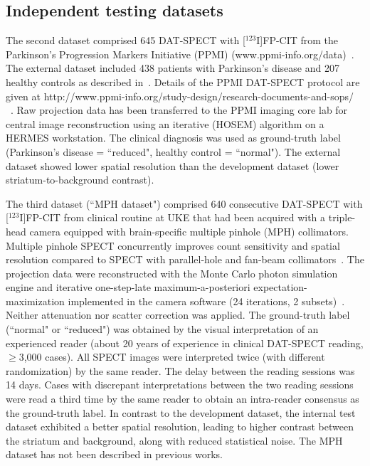 \subsection{Independent testing datasets}
\label{subsec:external_dataset}

The second dataset comprised 645 DAT-SPECT with [$^{123}$I]FP-CIT from the Parkinson's Progression Markers Initiative (PPMI) 
(www.ppmi-info.org/data)~\citep{Parkinson_Progression_Marker_Initiative2011-px}.
The external dataset included 438 patients with Parkinson's disease and 207 healthy controls as described in~\cite{Wenzel2019}.
Details of the PPMI DAT-SPECT protocol are given at http://www.ppmi-info.org/study-design/research-documents-and-sops/ ~\citep{Parkinson_Progression_Marker_Initiative2011-px}. 
Raw projection data has been transferred to the PPMI imaging core lab for central image reconstruction using an iterative (HOSEM) algorithm on a HERMES workstation. 
The clinical diagnosis was used as ground-truth label (Parkinson's disease = ``reduced", healthy control = ``normal"). 
The external dataset showed lower spatial resolution than the development dataset (lower striatum-to-background contrast).

The third dataset (``MPH dataset") comprised 640 consecutive DAT-SPECT with [$^{123}$I]FP-CIT from clinical routine at UKE 
that had been acquired with a triple-head camera equipped with brain-specific multiple pinhole (MPH) collimators. 
Multiple pinhole SPECT concurrently improves count sensitivity and spatial resolution compared to SPECT with parallel-hole 
and fan-beam collimators~\citep{Mathies2022-yi, Tecklenburg2020-xr}.
The projection data were reconstructed with the Monte Carlo photon simulation engine 
and iterative one-step-late maximum-a-posteriori expectation-maximization implemented 
in the camera software (24 iterations, 2 subsets)~\citep{Tecklenburg2020-xr, Magdics2010}.
Neither attenuation nor scatter correction was applied. 
The ground-truth label (``normal" or ``reduced") was obtained by the visual interpretation of an experienced reader 
(about 20 years of experience in clinical DAT-SPECT reading, $\geq$3,000 cases).
All SPECT images were interpreted twice (with different randomization) by the same reader. 
The delay between the reading sessions was 14 days. 
Cases with discrepant interpretations between the two reading sessions were read a third time by the same reader 
to obtain an intra-reader consensus as the ground-truth label. 
In contrast to the development dataset, the internal test dataset exhibited a better spatial resolution, 
leading to higher contrast between the striatum and background, along with reduced statistical noise.
The MPH dataset has not been described in previous works.
